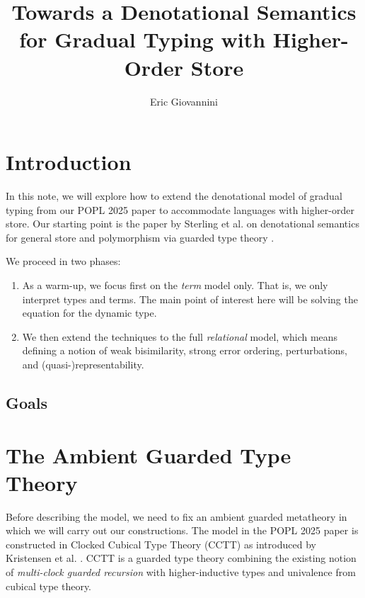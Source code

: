 \documentclass{article}
\theoremstyle{definition}
\theoremstyle{remark}
\begin{document}
\title{Towards a Denotational Semantics for Gradual Typing with Higher-Order Store}
\author{Eric Giovannini}

\maketitle

\section{Introduction}

In this note, we will explore how to extend the denotational model of gradual
typing from our POPL 2025 paper \cite{gradualtyping-popl2025} to accommodate
languages with higher-order store. Our starting point is the paper by Sterling
et al. on denotational semantics for general store and polymorphism via guarded
type theory \cite{DBLP:journals/corr/abs-2210-02169}.

We proceed in two phases:
\begin{enumerate}
    \item As a warm-up, we focus first on the \emph{term} model only. That is,
    we only interpret types and terms. The main point of interest here will be
    solving the equation for the dynamic type.
    \item We then extend the techniques to the full \emph{relational} model,
    which means defining a notion of weak bisimilarity, strong error ordering,
    perturbations, and (quasi-)representability.
\end{enumerate}

\subsection{Goals}




\section{The Ambient Guarded Type Theory}

Before describing the model, we need to fix an ambient guarded metatheory in
which we will carry out our constructions.
%
The model in the POPL 2025 paper is constructed in Clocked Cubical Type Theory
(CCTT) as introduced by Kristensen et al.
\cite{kristensen-mogelberg-vezzosi2022}. CCTT is a guarded type theory combining
the existing notion of \emph{multi-clock guarded recursion} \cite{atkey-mcbride2013}
with higher-inductive types and univalence from cubical type theory.
\end{document}

